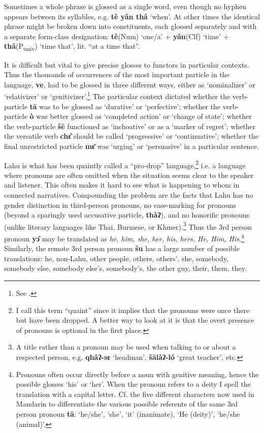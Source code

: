 Sometimes a whole phrase is glossed as a single word, even though no
hyphen appears between its syllables, e.g. \textbf{tê yân thâ} `when'.
At other times the identical phrase might be broken down into
constituents, each glossed separately and with a separate form-class
designation: \textbf{tê}(Num) `one/a' + \textbf{yân}(Clf) `time' +
\textbf{thâ}(P\textsubscript{univ}) `time that', lit. ``at a time that''.

It is difficult but vital to give precise glosses to functors in
particular contexts. Thus the thousands of occurrences of the most
important particle in the language, \textbf{ve}, had to be glossed in
three different ways, either as `nominalizer' or `relativizer' or
`genitivizer'.\footnote{See \citet{matisoff1972}.} The particular context
dictated whether the verb-particle \textbf{tā} was to be glossed as
`durative' or `perfective'; whether the verb-particle \textbf{ò} was
better glossed as `completed action' or `change of state'; whether the
verb-particle \textbf{šē} functioned as `inchoative' or as a `marker of
regret'; whether the versatile verb \textbf{chɛ̂} should be called
`progressive' or `continuative'; whether the final unrestricted particle
\textbf{mɛ̄} was `urging' or `persuasive' in a particular sentence.

Lahu is what has been quaintly called a ``pro-drop''
language,\footnote{I call this term ``quaint'' since it implies that
  the pronouns were once there but have been dropped. A better way to
  look at it is that the overt presence of pronouns is optional in the
  first place.} i.e. a language where pronouns are often omitted when
the situation seems clear to the speaker and listener. This often
makes it hard to see what is happening to whom in connected
narratives. Compounding the problem are the facts that Lahu has no
gender distinction in third-person pronouns, no case-marking for
pronouns (beyond a sparingly used accusative particle, \textbf{thàʔ}),
and no honorific pronouns (unlike literary languages like Thai,
Burmese, or Khmer).\footnote{A title rather than a pronoun may be used
  when talking to or about a respected person, e.g. \textbf{qhâʔ-sɛ}
  `headman', \textbf{šālàʔ-ló} `great teacher', etc. } Thus the 3rd
person pronoun \textbf{yɔ̂ }may be translated as \emph{he, him, she,
  her, his, hers, He, Him, His}.\footnote{Pronouns often occur
  directly before a noun with genitive meaning, hence the possible
  glosses `his' or `her'.  When the pronoun refers to a deity I spell
  the translation with a capital letter. Cf. the five different
  characters now used in Mandarin to differentiate the various
  possible referents of the same 3rd person pronoun
  \textbf{tā}:  `he/she',  `she',  `it' (inanimate),  `He
  (deity)',  `he/she (animal)'.} Similarly, the remote 3rd person
pronoun \textbf{šu} has a large number of possible
translations: he, non-Lahu, other people,
others, others', she, somebody, somebody else, somebody else's,
somebody's, the other guy, their, them, they.

